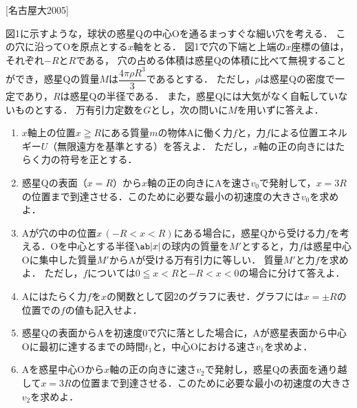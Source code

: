 



\noindent
{} [名古屋大2005]

図1に示すような，球状の惑星Qの中心Oを通るまっすぐな細い穴を考える．
この穴に沿ってOを原点とする$x$軸をとる．
図1で穴の下端と上端の$x$座標の値は，それぞれ$-R$と$R$である，
穴の占める体積は惑星Qの体積に比べて無視することができ，惑星Qの質量$M$は$\dfrac{4\pi\rho R^3}{3}$であるとする．
ただし，$\rho$は惑星Qの密度で一定であり，$R$は惑星Qの半径である．
また，惑星Qには大気がなく自転していないものとする．
万有引力定数を$G$とし，次の問いに$M$を用いずに答えよ．
\begin{enumerate}[(1)]
  \item {\hzw}$x$軸上の位置$x \geqq R$にある質量$m$の物体Aに働く力$f$と，力$f$による位置エネルギー$U$（無限遠方を基準とする）を答えよ．
  ただし，$x$軸の正の向きにはたらく力の符号を正とする．
  \item {\hzw}惑星Qの表面（$x = R$）から$x$軸の正の向きにAを速さ$v_0$で発射して，$x = 3R$の位置まで到達させる．このために必要な最小の初速度の大きさ$v_0$を求めよ．
  \item {\hzw}Aが穴の中の位置$x\, (-R < x < R)$にある場合に，惑星Qから受ける力$f$を考える．Oを中心とする半径$\ab|x|$の球内の質量を$M'$とすると，力$f$は惑星中心Oに集中した質量$M'$からAが受ける万有引力に等しい．
  質量$M'$と力$f$を求めよ．
  ただし，$f$については$0 \leqq x < R$と$-R < x <0$の場合に分けて答えよ．
  \item {\hzw}Aにはたらく力$f$を$x$の関数として図2のグラフに表せ．グラフには$x = \pm R$の位置での$f$の値も記入せよ．
  \item {\hzw}惑星Qの表面からAを初速度0で穴に落とした場合に，Aが惑星表面から中心Oに最初に達するまでの時間$t_1$と，中心Oにおける速さ$v_1$を求めよ．
  \item {\hzw}Aを惑星中心Oから$x$軸の正の向きに速さ$v_2$で発射し，惑星Qの表面を通り越して$x = 3R$の位置まで到達させる．このために必要な最小の初速度の大きさ$v_2$を求めよ．
\end{enumerate}

